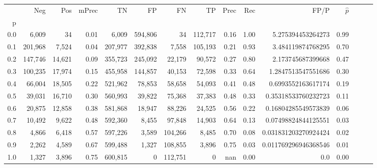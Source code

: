 \begin{tabular}{rrrrrrrrrrrrrrr}
\toprule
{} &      Neg &     Pos & mPrec &       TN &       FP &       FN &       TP &  Prec &   Rec &                  FP/P & $\hat{p}$ \\
p   &          &         &       &          &          &          &          &       &       &                       &           \\
\midrule
0.0 &    6,009 &      34 &  0.01 &    6,009 &  594,806 &       34 &  112,717 &  0.16 &  1.00 &     5.275394453264273 &      0.99 \\
0.1 &  201,968 &   7,524 &  0.04 &  207,977 &  392,838 &    7,558 &  105,193 &  0.21 &  0.93 &     3.484119874768295 &      0.70 \\
0.2 &  147,746 &  14,621 &  0.09 &  355,723 &  245,092 &   22,179 &   90,572 &  0.27 &  0.80 &     2.173745687399668 &      0.47 \\
0.3 &  100,235 &  17,974 &  0.15 &  455,958 &  144,857 &   40,153 &   72,598 &  0.33 &  0.64 &    1.2847513547551686 &      0.30 \\
0.4 &   66,004 &  18,505 &  0.22 &  521,962 &   78,853 &   58,658 &   54,093 &  0.41 &  0.48 &    0.6993552163617174 &      0.19 \\
0.5 &   39,031 &  16,710 &  0.30 &  560,993 &   39,822 &   75,368 &   37,383 &  0.48 &  0.33 &   0.35318533760232723 &      0.11 \\
0.6 &   20,875 &  12,858 &  0.38 &  581,868 &   18,947 &   88,226 &   24,525 &  0.56 &  0.22 &   0.16804285549573839 &      0.06 \\
0.7 &   10,492 &   9,622 &  0.48 &  592,360 &    8,455 &   97,848 &   14,903 &  0.64 &  0.13 &   0.07498824844125551 &      0.03 \\
0.8 &    4,866 &   6,418 &  0.57 &  597,226 &    3,589 &  104,266 &    8,485 &  0.70 &  0.08 &  0.031831203270924424 &      0.02 \\
0.9 &    2,262 &   4,589 &  0.67 &  599,488 &    1,327 &  108,855 &    3,896 &  0.75 &  0.03 &  0.011769296946368546 &      0.01 \\
1.0 &    1,327 &   3,896 &  0.75 &  600,815 &        0 &  112,751 &        0 &   nan &  0.00 &                   0.0 &      0.00 \\
\bottomrule
\end{tabular}

